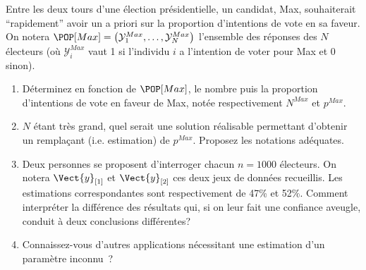 \documentclass[10pt]{report}
\begin{document}
\begin{exercice}

Entre les deux tours d'une élection présidentielle, un candidat, Max, souhaiterait ``rapidement'' avoir un a priori sur la proportion d'intentions de vote en sa faveur. On notera $\POP[Max]=\left( \mathcal{Y}_1^{Max},\ldots, \mathcal{Y}_N^{Max}\right)$ l'ensemble des réponses des $N$ électeurs (où $\mathcal{Y}_i^{Max}$ vaut 1 si l'individu $i$ a l'intention de voter pour Max et 0 sinon).

\begin{enumerate}
\item Déterminez en fonction de $\POP[Max]$, le nombre puis la proportion d'intentions de vote en faveur de Max, notée respectivement $N^{Max}$ et $p^{Max}$.

\item $N$ étant très grand, quel serait une solution réalisable permettant d'obtenir un remplaçant (i.e. estimation) de $p^{Max}$. Proposez les notations adéquates.

\item Deux personnes se proposent d'interroger chacun $n=1000$ électeurs. On notera $\Vect{y}_{[1]}$ et $\Vect{y}_{[2]}$ ces deux jeux de données recueillis. Les estimations correspondantes sont respectivement de 47\% et 52\%. Comment interpréter la différence des résultats qui, si on leur fait une confiance aveugle, conduit à deux conclusions différentes?

\item Connaissez-vous d'autres applications nécessitant une estimation d'un paramètre inconnu~?

\end{enumerate}
\end{exercice}
\end{document}
